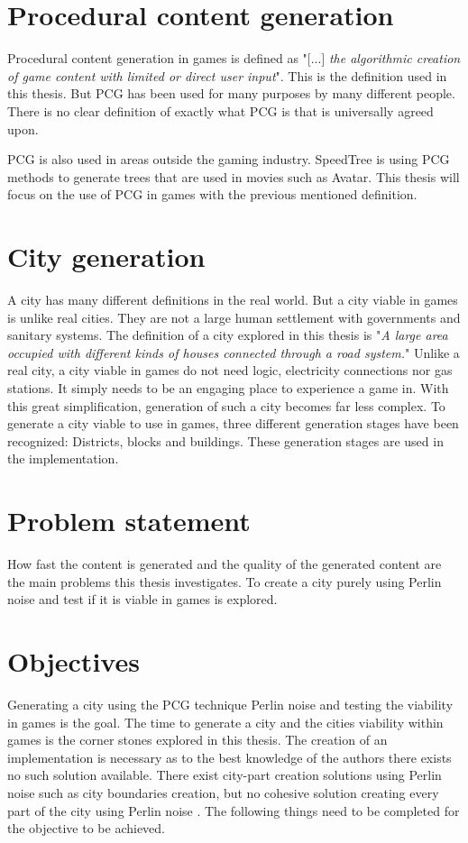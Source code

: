 	\section{Procedural content generation}
	Procedural content generation in games is defined as "[...] \textit{the algorithmic creation of game content with limited or direct user input}"\cite{WhatIsPCG}. This is the definition used in this thesis. But PCG has been used for many purposes by many different people. There is no clear definition of exactly what PCG is that is universally agreed upon\cite{WhatIsPCG}.
	
	PCG is also used in areas outside the gaming industry. SpeedTree\cite{SpeedTree} is using PCG methods to generate trees that are used in movies such as Avatar\cite{SpeedTreeMovies}.
	This thesis will focus on the use of PCG in games with the previous mentioned definition.
	
	\section{City generation}
	A city has many different definitions in the real world. But a city viable in games is unlike real cities. They are not a large human settlement with governments and sanitary systems. The definition of a city explored in this thesis is "\textit{A large area occupied with different kinds of houses connected through a road system.}"
	Unlike a real city, a city viable in games do not need logic, electricity connections nor gas stations. It simply needs to be an engaging place to experience a game in. With this great simplification, generation of such a city becomes far less complex.
	To generate a city viable to use in games, three different generation stages have been recognized: Districts, blocks and buildings. These generation stages are used in the implementation.
	
	\section{Problem statement}
	How fast the content is generated and the quality of the generated content are the main problems this thesis investigates.
	To create a city purely using Perlin noise and test if it is viable in games is explored.
	
	\section{Objectives}
	Generating a city using the PCG technique Perlin noise and testing the viability in games is the goal. The time to generate a city and the cities viability within games is the corner stones explored in this thesis. The creation of an implementation is necessary as to the best knowledge of the authors there exists no such solution available.
	There exist city-part creation solutions using Perlin noise such as city boundaries creation, but no cohesive solution creating every part of the city using Perlin noise \cite{CityBoundariesPerlin}.
	The following things need to be completed for the objective to be achieved.
	

